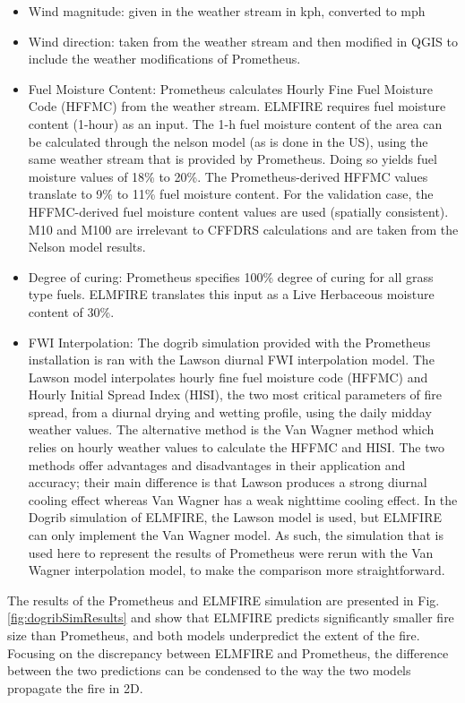 \begin{itemize}
    \item Wind magnitude: given in the weather stream in kph, converted to mph
    \item Wind direction: taken from the weather stream and then modified in QGIS to include the weather modifications of Prometheus. 
    \item Fuel Moisture Content: Prometheus calculates Hourly Fine Fuel Moisture Code (HFFMC) from the weather stream. ELMFIRE requires fuel moisture content (1-hour) as an input. The 1-h fuel moisture content of the area can be calculated through the nelson model (as is done in the US), using the same weather stream that is provided by Prometheus. Doing so yields fuel moisture values of 18\% to 20\%. The Prometheus-derived HFFMC values translate to 9\% to 11\% fuel moisture content. For the validation case, the HFFMC-derived fuel moisture content values are used (spatially consistent). M10 and M100 are irrelevant to CFFDRS calculations and are taken from the Nelson model results.
    \item Degree of curing: Prometheus specifies 100\% degree of curing for all grass type fuels. ELMFIRE translates this input as a Live Herbaceous moisture content of 30\%.
    \item FWI Interpolation: The dogrib simulation provided with the Prometheus installation is ran with the Lawson diurnal FWI interpolation model. The Lawson model interpolates hourly fine fuel moisture code (HFFMC) and Hourly Initial Spread Index (HISI), the two most critical parameters of fire spread, from a diurnal drying and wetting profile, using the daily midday weather values. The alternative method is the Van Wagner method which relies on hourly weather values to calculate the HFFMC and HISI. The two methods offer advantages and disadvantages in their application and accuracy; their main difference is that Lawson produces a strong diurnal cooling effect whereas Van Wagner has a weak nighttime cooling effect. In the Dogrib simulation of ELMFIRE, the Lawson model is used, but ELMFIRE can only implement the Van Wagner model. As such, the simulation that is used here to represent the results of Prometheus were rerun with the Van Wagner interpolation model, to make the comparison more straightforward. 
\end{itemize}

The results of the Prometheus and ELMFIRE simulation are presented in Fig. \ref{fig:dogribSimResults} and show that ELMFIRE predicts significantly smaller fire size than Prometheus, and both models underpredict the extent of the fire. Focusing on the discrepancy between ELMFIRE and Prometheus, the difference between the two predictions can be condensed to the way the two models propagate the fire in 2D. 

